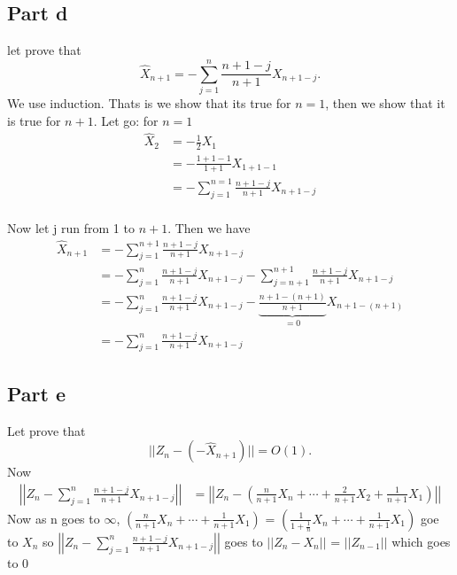 \documentclass[11pt, oneside]{article}   	%
\begin{document}
\subsection{Part d}
let prove that 
\begin{equation}
\widehat{X}_{n+1} = -\sum_{j=1}^{n}\frac{n+1-j}{n+1}X_{n+1-j}.
\end{equation}
We use induction. Thats is we show that its true for $n = 1$, then we show that it is true for $n+1$. Let go:
for $n = 1$
\begin{equation}
\begin{split}
 \widehat{X}_{2} &= -\frac{1}{2}X_{1}\\
 &=-\frac{1+1-1}{1+1}X_{1+1-1}\\
 &=-\sum_{j=1}^{n=1}\frac{n+1-j}{n+1}X_{n+1-j}\\
 \end{split}
 \end{equation}

Now let j run from 1 to $n+1$. Then we have 
 \begin{equation}
 \begin{split}
\widehat{X}_{n+1} &= -\sum_{j=1}^{n+1}\frac{n+1-j}{n+1}X_{n+1-j}\\
&= -\sum_{j=1}^{n}\frac{n+1-j}{n+1}X_{n+1-j} -\sum_{j=n+1}^{n+1}\frac{n+1-j}{n+1}X_{n+1-j}\\
&= -\sum_{j=1}^{n}\frac{n+1-j}{n+1}X_{n+1-j} -\underbrace{\frac{n+1-(n+1)}{n+1}}_{ = 0}X_{n+1-(n+1)}\\
&=-\sum_{j=1}^{n}\frac{n+1-j}{n+1}X_{n+1-j}
\end{split}
\end{equation}

\subsection{Part e}
Let prove that 
\begin{equation}
|| Z_{n}- (-\widehat{X}_{n+1})|| = O(1).
\end{equation}
Now 
\begin{equation}
\begin{split}
\left|\left| Z_{n}- \sum_{j=1}^{n}\frac{n+1-j}{n+1}X_{n+1-j}\right|\right| &= \left|\left| Z_{n}- \left(\frac{n}{n+1}X_{n}+ \cdots+\frac{2}{n+1}X_{2}+ \frac{1}{n+1}X_{1}\right)\right|\right|
\end{split}
\end{equation}
Now as n goes to $\infty$, $\left(\frac{n}{n+1}X_{n}+ \cdots+ \frac{1}{n+1}X_{1}\right)$ =  $\left(\frac{1}{1+\frac{1}{n}}X_{n}+ \cdots+ \frac{1}{n+1}X_{1}\right)$ goe to $X_{n}$ so 
$\left|\left| Z_{n}- \sum_{j=1}^{n}\frac{n+1-j}{n+1}X_{n+1-j}\right|\right| $ goes to $|| Z_{n}-X_{n} ||$ = $|| Z_{n-1} ||$ which goes to 0
\end{document}
